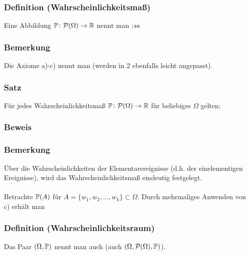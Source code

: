 \subsubsection{Definition (Wahrscheinlichkeitsma\ss{})}
Eine Abbildung $\mathbb{P}\colon\mathcal{P}(\Omega)\to\mathbb{R}$ nennt man  $:\Leftrightarrow$
\subsubsection{Bemerkung}
Die Axiome a)-c) nennt man  (werden in 2 ebenfalls leicht angepasst).
\subsubsection{Satz}
F\"ur jedes Wahrscheinlichkeitsma\ss{} $\mathbb{P}\colon\mathcal{P}(\Omega)\to\mathbb{R}$ f\"ur beliebiges $\Omega$ gelten:
\subsubsection{Beweis}
\weg
\subsubsection{Bemerkung}
\"Uber die Wahrscheinlichkeiten der Elementarereignisse (d.h. der einelementigen Ereignisse), wird das Wahrscheinlichkeitsma\ss{} eindeutig festgelegt.
\\~\\
Betrachte $\mathbb{P}(A)$ f\"ur $A=\{w_1,w_2,\ldots,w_k\}\subset\Omega$. Durch mehrmaliges Anwenden von c) erh\"alt man
\subsubsection{Definition (Wahrscheinlichkeitsraum)}
Das Paar $(\Omega,\mathbb{P})$ nennt man auch  (auch $(\Omega,\mathcal{P}(\Omega),\mathbb{P})$).

